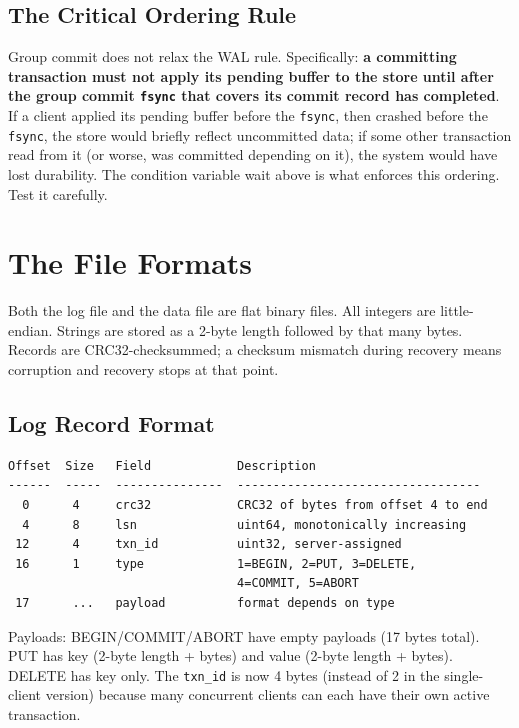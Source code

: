 \documentclass[11pt,a4paper]{article}
\begin{document}
\subsection{The Critical Ordering Rule}
Group commit does not relax the WAL rule. Specifically: \textbf{a committing transaction must not apply its pending buffer to the store until after the group commit \texttt{fsync} that covers its commit record has completed}. If a client applied its pending buffer before the \texttt{fsync}, then crashed before the \texttt{fsync}, the store would briefly reflect uncommitted data; if some other transaction read from it (or worse, was committed depending on it), the system would have lost durability. The condition variable wait above is what enforces this ordering. Test it carefully.

\section{The File Formats}

Both the log file and the data file are flat binary files. All integers are little-endian. Strings are stored as a 2-byte length followed by that many bytes. Records are CRC32-checksummed; a checksum mismatch during recovery means corruption and recovery stops at that point.

\subsection{Log Record Format}

\begin{codebox}
\begin{lstlisting}
Offset  Size   Field            Description
------  -----  ---------------  ----------------------------------
  0      4     crc32            CRC32 of bytes from offset 4 to end
  4      8     lsn              uint64, monotonically increasing
 12      4     txn_id           uint32, server-assigned
 16      1     type             1=BEGIN, 2=PUT, 3=DELETE,
                                4=COMMIT, 5=ABORT
 17      ...   payload          format depends on type
\end{lstlisting}
\end{codebox}

Payloads: BEGIN/COMMIT/ABORT have empty payloads (17 bytes total). PUT has key (2-byte length + bytes) and value (2-byte length + bytes). DELETE has key only. The \texttt{txn\_id} is now 4 bytes (instead of 2 in the single-client version) because many concurrent clients can each have their own active transaction.
\end{document}
